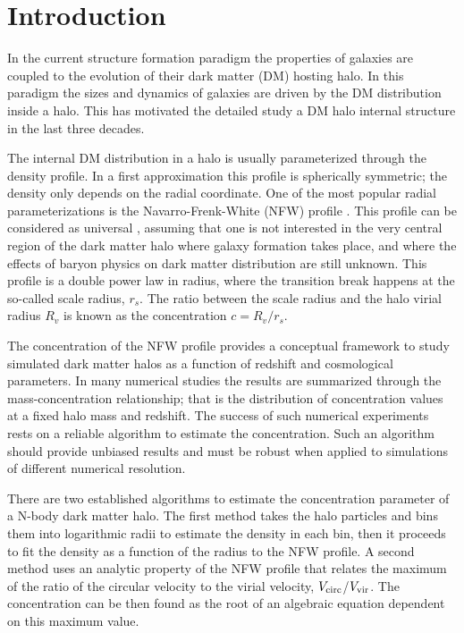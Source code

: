 \documentclass{emulateapj}
\begin{document}
\section{Introduction}
\label{sec:introduction}
In the current structure formation paradigm the properties of galaxies
are coupled to the evolution of their dark matter (DM) hosting halo.
In this paradigm the sizes and dynamics of galaxies are driven by
the DM distribution inside a halo. This has motivated the detailed study
a DM halo internal structure in the last three decades. 

The internal DM distribution in a halo is usually parameterized
through the density profile.  In a first approximation this profile is
spherically symmetric; the density only depends on the radial
coordinate.  One of the most popular radial parameterizations is
the Navarro-Frenk-White (NFW) profile \citep{NFW}.  
This profile can be considered as universal \citep{Navarro2010}, assuming that 
one is not interested in the very central region of the dark matter halo where
galaxy formation takes place, and where the effects of baryon physics
on dark matter distribution are still unknown.
This profile is a double power law in radius, where the transition
break happens at the so-called scale radius, $r_s$.  The ratio between
the scale radius and the halo virial radius $R_v$ is known as the
concentration $c=R_v/r_s$.


The concentration of the NFW profile provides a conceptual framework
to study simulated dark matter halos as a function of redshift and
cosmological parameters.  In many numerical studies
\citep{Neto2007,Maccio2008,Duffy2008,Munoz2011,Prada2012,Ludlow2014}
the results are summarized through the mass-concentration
relationship; that is the distribution of concentration values at a
fixed halo mass and redshift.  The success of such numerical
experiments rests on a reliable algorithm to estimate the
concentration.  Such an algorithm should provide unbiased results and
must be robust when applied to simulations of different numerical
resolution.

There are two established algorithms to estimate the concentration
parameter of a N-body dark matter halo.  The first method takes the
halo particles and bins them into logarithmic radii to estimate the
density in each bin, then it proceeds to fit the density as a function
of the radius to the NFW profile.  A second method uses an analytic
property of the NFW profile that relates the maximum of the ratio of
the circular velocity to the virial velocity, $V_{\rm circ}$/$V_{\rm
  vir}$.  The concentration can be then found as the root of an
algebraic equation dependent on this maximum value.
\end{document}
